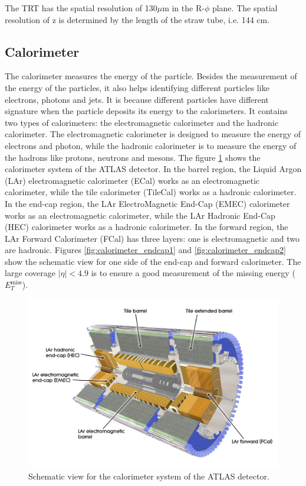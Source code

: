 The TRT has the spatial resolution of 130$\mu$m in the R-$\phi$ plane.
The spatial resolution of z is determined by the length of the straw tube, i.e. 144 cm.

\subsection{Calorimeter}
The calorimeter measures the energy of the particle.
Besides the measurement of the energy of the particles, it also helps identifying different particles like electrons, photons and jets.
It is because different particles have different signature when the particle deposits its energy to the calorimeters.
It contains two types of calorimeters: the electromagnetic calorimeter and the hadronic calorimeter.
The electromagnetic calorimeter is designed to measure the energy of electrons and photon, while the hadronic calorimeter is to measure the energy of the hadrons like protons, neutrons and mesons.
The figure \ref{fig:calorimeter_whole} shows the calorimeter system of the ATLAS detector.
In the barrel region, the Liquid Argon (LAr) electromagnetic calorimeter (ECal) works as an electromagnetic calorimeter, while the tile calorimeter (TileCal) works as a hadronic calorimeter.
In the end-cap region, the LAr ElectroMagnetic End-Cap (EMEC) calorimeter works as an electromagnetic calorimeter, while the LAr Hadronic End-Cap (HEC) calorimeter works as a hadronic calorimeter.
In the forward region, the LAr Forward Calorimeter (FCal) has three layers: one is electromagnetic and two are hadronic.
Figures \ref{fig:calorimeter_endcap1} and \ref{fig:calorimeter_endcap2} show the schematic view for one side of the end-cap and forward calorimeter.
The large coverage $|\eta| < 4.9$ is to ensure a good measurement of the missing energy ($E_T^{\text{miss}}$).

\begin{figure}
\centering
\includegraphics[width=\textwidth]{data/photo/detector/calorimeter_whole.jpg}
\caption{Schematic view for the calorimeter system of the ATLAS detector. \cite{calorimeter_whole}}
\label{fig:calorimeter_whole}
\end{figure}


